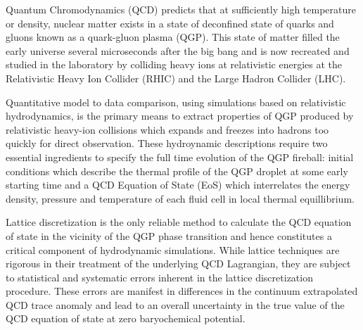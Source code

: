 \documentclass[aps,prc,reprint,amsmath,nofootinbib,superscriptaddress]{revtex4-1}
\begin{document}
Quantum Chromodynamics (QCD) predicts that at sufficiently high temperature or density, nuclear matter exists in a state of deconfined state of quarks and gluons known as a quark-gluon plasma (QGP). 
This state of matter filled the early universe several microseconds after the big bang and is now recreated and studied in the laboratory by colliding heavy ions at relativistic energies at the Relativistic Heavy Ion Collider (RHIC) and the Large Hadron Collider (LHC).

Quantitative model to data comparison, using simulations based on relativistic hydrodynamics, is the primary means to extract properties of QGP produced by relativistic heavy-ion collisions which expands and freezes into hadrons too quickly for direct observation. 
These hydroynamic descriptions require two essential ingredients to specify the full time evolution of the QGP fireball: initial conditions which describe the thermal profile of the QGP droplet at some early starting time and a QCD Equation of State (EoS) which interrelates the energy density, pressure and temperature of each fluid cell in local thermal equillibrium.

Lattice discretization is the only reliable method to calculate the QCD equation of state in the vicinity of the QGP phase transition and hence constitutes a critical component of hydrodynamic simulations. 
While lattice techniques are rigorous in their treatment of the underlying QCD Lagrangian, they are subject to statistical and systematic errors inherent in the lattice discretization procedure. 
These errors are manifest in differences in the continuum extrapolated QCD trace anomaly and lead to an overall uncertainty in the true value of the QCD equation of state at zero baryochemical potential.
\end{document}
